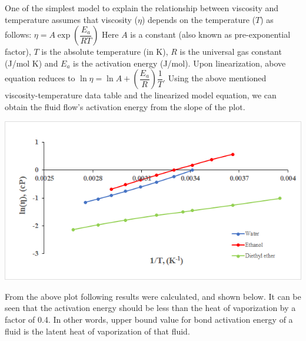 \documentclass[a4paper,12pt]{report}
\begin{document}
\noindent One of the simplest model to explain the relationship between viscosity and temperature assumes that viscosity ($\eta$) depends on the temperature ($T$) as follows:
$\eta = A \exp \left(\dfrac{E_a}{RT} \right) \label{3}$ Here $A$ is a constant (also known as pre-exponential factor), $T$ is the absolute temperature (in K), $R$ is the universal gas constant (J/mol K) and $E_a$ is the activation energy (J/mol). Upon linearization, above equation reduces to $\ln \eta = \ln A + \left( \dfrac{E_a}{R} \right) \dfrac{1}{T} \label{4}
$. Using the above mentioned viscosity-temperature data table and the linearized model equation, we can obtain the fluid flow's activation energy from the slope of the plot. 
\begin{center}
\includegraphics{plot.png}    
\end{center}
From the above plot following results were calculated, and shown below. It can be seen that the activation energy should be less than the heat of vaporization by a factor of 0.4. In other words, upper bound value for bond activation energy of a fluid is the latent heat of vaporization of that fluid.
\begin{table}[H]
\centering
{}
\end{table}
\end{document}

